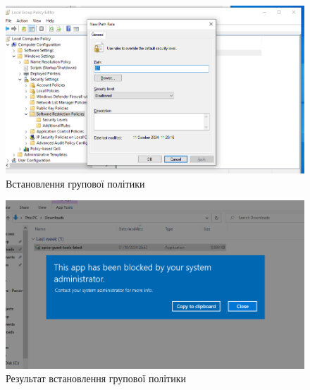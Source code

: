 \documentclass[oneside,14pt]{extarticle}
\begin{document}
\begin{normalsize}
	\begin{figure}[H]
		\centering
		\includegraphics[width=\columnwidth]{7}
		\caption{Встановлення групової політики}
	\end{figure}
	
	\begin{figure}[H]
		\centering
		\includegraphics[width=\columnwidth]{8}
		\caption{Результат встановлення групової політики}
	\end{figure}
	

\end{normalsize}
\end{document}
